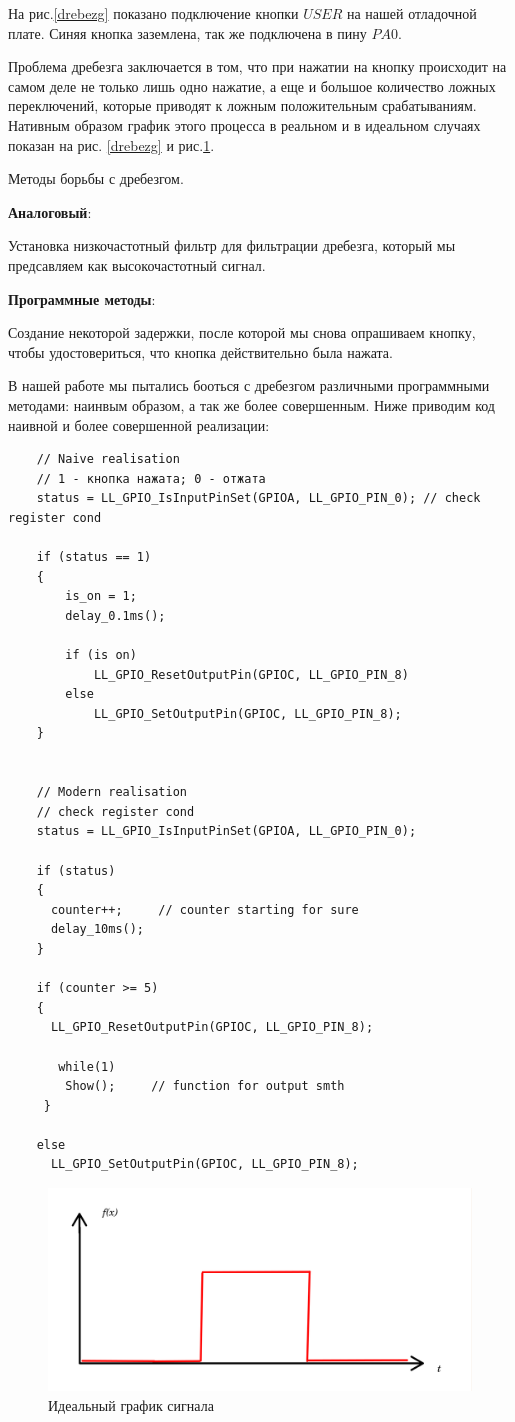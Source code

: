 На рис.\ref{drebezg} показано подключение кнопки $USER$ на нашей отладочной плате.
Синяя кнопка заземлена, так же подключена в пину $PA0$. 
	
	
Проблема дребезга заключается в том, что при нажатии на кнопку происходит на самом деле не только лишь одно нажатие, а еще и большое количество ложных переключений, которые приводят к ложным положительным срабатываниям. Нативным образом график этого процесса в реальном и в идеальном случаях показан на рис. \ref{drebezg} и рис.\ref{ideal_graph}.

Методы борьбы с дребезгом.

\textbf{Аналоговый}:

Установка низкочастотный фильтр для фильтрации дребезга, который мы предсавляем как высокочастотный сигнал.

\textbf{Программные методы}:

Создание некоторой задержки, после которой мы снова опрашиваем кнопку, чтобы удостовериться, что кнопка действительно была нажата.


В нашей работе мы пытались бооться с дребезгом различными программными методами: наинвым образом, а так же более совершенным. Ниже приводим код наивной и более совершенной реализации:

\begin{verbatim}
    // Naive realisation
    // 1 - кнопка нажата; 0 - отжата
    status = LL_GPIO_IsInputPinSet(GPIOA, LL_GPIO_PIN_0); // check register cond
    
    if (status == 1) 
    {   
        is_on = 1;
        delay_0.1ms();
        
        if (is on)
            LL_GPIO_ResetOutputPin(GPIOC, LL_GPIO_PIN_8) 
        else 
            LL_GPIO_SetOutputPin(GPIOC, LL_GPIO_PIN_8);
    }
    
    
    // Modern realisation
    // check register cond
    status = LL_GPIO_IsInputPinSet(GPIOA, LL_GPIO_PIN_0);
 
    if (status)
    {
      counter++;     // counter starting for sure
      delay_10ms();
    }
        
    if (counter >= 5)                                   
    {
      LL_GPIO_ResetOutputPin(GPIOC, LL_GPIO_PIN_8);
        
       while(1)
        Show();     // function for output smth
     }
   
    else
      LL_GPIO_SetOutputPin(GPIOC, LL_GPIO_PIN_8);
\end{verbatim}



\begin{figure}[h!]
		\centering
		\includegraphics[width=1\linewidth]{pics/ideal_sing.png}
		\caption{Идеальный график сигнала}
		\label{ideal_graph}
\end{figure}
